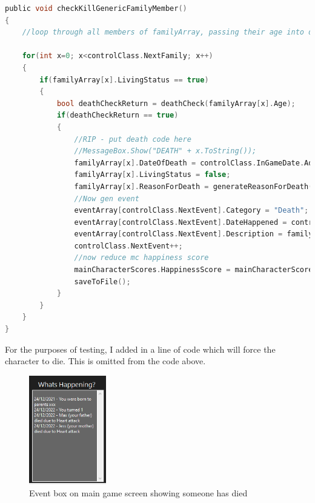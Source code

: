 \begin{lstlisting}[language=c, style=csharp, caption=Death algorithm for a non-main character]
public void checkKillGenericFamilyMember()
{
    //loop through all members of familyArray, passing their age into deathCheck. if return=true then kill, else move onto next.

    for(int x=0; x<controlClass.NextFamily; x++)
    {
        if(familyArray[x].LivingStatus == true)
        {
            bool deathCheckReturn = deathCheck(familyArray[x].Age);
            if(deathCheckReturn == true)
            {
                //RIP - put death code here
                //MessageBox.Show("DEATH" + x.ToString());
                familyArray[x].DateOfDeath = controlClass.InGameDate.AddDays(randomNumber(1, 300));
                familyArray[x].LivingStatus = false;
                familyArray[x].ReasonForDeath = generateReasonForDeath();
                //Now gen event
                eventArray[controlClass.NextEvent].Category = "Death";
                eventArray[controlClass.NextEvent].DateHappened = controlClass.InGameDate;
                eventArray[controlClass.NextEvent].Description = familyArray[x].FirstName + " (your " + familyArray[x].RelationshipToMain.ToLower() + ") died due to " + familyArray[x].ReasonForDeath;
                controlClass.NextEvent++;
                //now reduce mc happiness score
                mainCharacterScores.HappinessScore = mainCharacterScores.HappinessScore - randomNumber(1, 100);
                saveToFile();
            }
        }
    }
}
\end{lstlisting}
For the purposes of testing, I added in a line of code which will force the character to die. This is omitted from the code above.\\
\begin{figure}[H]
    \centering
    \includegraphics[width=0.3\textwidth]{images/implementation/deathProofGeneric.png}
    \caption{Event box on main game screen showing someone has died}
    \label{fig:implementation-deathProofGeneric}
\end{figure}
